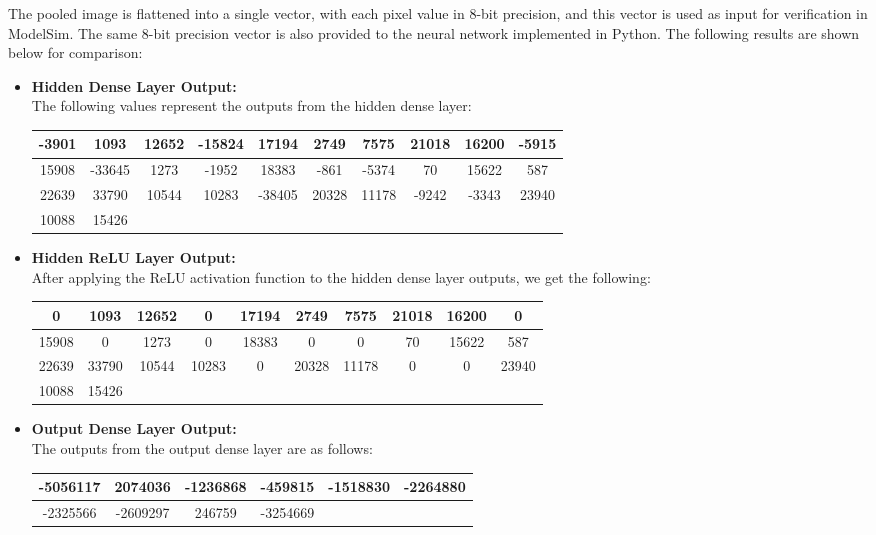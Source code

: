 \documentclass[11pt]{report}
\begin{document}
The pooled image is flattened into a single vector, with each pixel value in 8-bit precision, and this vector is used as input for verification in ModelSim. The same 8-bit precision vector is also provided to the neural network implemented in Python. The following results are shown below for comparison:

\begin{itemize}
    \item \textbf{Hidden Dense Layer Output:} \\
    The following values represent the outputs from the hidden dense layer:

    \begin{tabular}{|c|c|c|c|c|c|c|c|c|c|}
    \hline
    -3901 & 1093 & 12652 & -15824 & 17194 & 2749 & 7575 & 21018 & 16200 & -5915 \\
    \hline
    15908 & -33645 & 1273 & -1952 & 18383 & -861 & -5374 & 70 & 15622 & 587 \\
    \hline
    22639 & 33790 & 10544 & 10283 & -38405 & 20328 & 11178 & -9242 & -3343 & 23940 \\
    \hline
    10088 & 15426 &  &  &  &  &  &  &  &  \\
    \hline
    \end{tabular}

    \item \textbf{Hidden ReLU Layer Output:} \\
    After applying the ReLU activation function to the hidden dense layer outputs, we get the following:

    \begin{tabular}{|c|c|c|c|c|c|c|c|c|c|}
    \hline
    0 & 1093 & 12652 & 0 & 17194 & 2749 & 7575 & 21018 & 16200 & 0 \\
    \hline
    15908 & 0 & 1273 & 0 & 18383 & 0 & 0 & 70 & 15622 & 587 \\
    \hline
    22639 & 33790 & 10544 & 10283 & 0 & 20328 & 11178 & 0 & 0 & 23940 \\
    \hline
    10088 & 15426 &  &  &  &  &  &  &  &  \\
    \hline
    \end{tabular}
    
    \item \textbf{Output Dense Layer Output:} \\
    The outputs from the output dense layer are as follows:

    \begin{tabular}{|c|c|c|c|c|c|}
    \hline
    -5056117 & 2074036 & -1236868 & -459815 & -1518830 & -2264880 \\
    \hline
    -2325566 & -2609297 & 246759 & -3254669 & & \\
    \hline
    \end{tabular}
    

\end{itemize}
\end{document}
